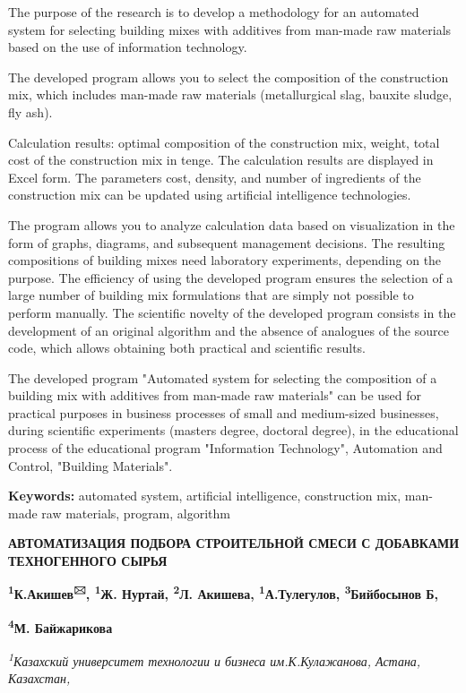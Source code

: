 \documentclass[
]{article}
\begin{document}
The purpose of the research is to develop a methodology for an automated
system for selecting building mixes with additives from man-made raw
materials based on the use of information technology.

The developed program allows you to select the composition of the
construction mix, which includes man-made raw materials (metallurgical
slag, bauxite sludge, fly ash).

Calculation results: optimal composition of the construction mix,
weight, total cost of the construction mix in tenge. The calculation
results are displayed in Excel form. The parameters cost, density, and
number of ingredients of the construction mix can be updated using
artificial intelligence technologies.

The program allows you to analyze calculation data based on
visualization in the form of graphs, diagrams, and subsequent management
decisions. The resulting compositions of building mixes need laboratory
experiments, depending on the purpose. The efficiency of using the
developed program ensures the selection of a large number of building
mix formulations that are simply not possible to perform manually. The
scientific novelty of the developed program consists in the development
of an original algorithm and the absence of analogues of the source
code, which allows obtaining both practical and scientific results.

The developed program "Automated system for selecting the composition of
a building mix with additives from man-made raw materials" can be used
for practical purposes in business processes of small and medium-sized
businesses, during scientific experiments (master\textquotesingle s
degree, doctoral degree), in the educational process of the educational
program "Information Technology", Automation and Control, "Building
Materials".

\textbf{Keywords:} automated system, artificial intelligence,
construction mix, man-made raw materials, program, algorithm

\textbf{АВТОМАТИЗАЦИЯ ПОДБОРА СТРОИТЕЛЬНОЙ СМЕСИ С ДОБАВКАМИ
ТЕХНОГЕННОГО СЫРЬЯ}

\textbf{\textsuperscript{1}К.Акишев\textsuperscript{🖂},
\textsuperscript{1}Ж. Нуртай, \textsuperscript{2}Л. Акишева,
\textsuperscript{1}А.Тулегулов, \textsuperscript{3}Бийбосынов Б,}

\textbf{\textsuperscript{4}М. Байжарикова}

\emph{\textsuperscript{1}Казахский университет технологии и бизнеса
им.К.Кулажанова, Астана, Казахстан,}
\end{document}
